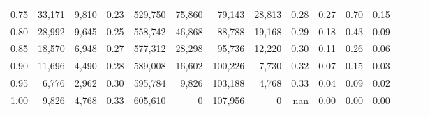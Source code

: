 \begin{tabular}{rrrrrrrrrrrrrrr}
0.75 &  33,171 &  9,810 &  0.23 &  529,750 &   75,860 &   79,143 &   28,813 &  0.28 &  0.27 &  0.70 &      0.15 \\
0.80 &  28,992 &  9,645 &  0.25 &  558,742 &   46,868 &   88,788 &   19,168 &  0.29 &  0.18 &  0.43 &      0.09 \\
0.85 &  18,570 &  6,948 &  0.27 &  577,312 &   28,298 &   95,736 &   12,220 &  0.30 &  0.11 &  0.26 &      0.06 \\
0.90 &  11,696 &  4,490 &  0.28 &  589,008 &   16,602 &  100,226 &    7,730 &  0.32 &  0.07 &  0.15 &      0.03 \\
0.95 &   6,776 &  2,962 &  0.30 &  595,784 &    9,826 &  103,188 &    4,768 &  0.33 &  0.04 &  0.09 &      0.02 \\
1.00 &   9,826 &  4,768 &  0.33 &  605,610 &        0 &  107,956 &        0 &   nan &  0.00 &  0.00 &      0.00 \\
\bottomrule
\end{tabular}
